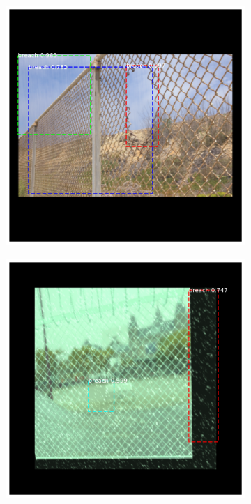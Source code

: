 \documentclass[../Head/Main.tex]{subfiles}
\begin{document}
\begin{figure}[H]
\begin{subfigure}{.23\textwidth}
        \caption{}
    \end{subfigure}
    \hfill
    \begin{subfigure}{.23\textwidth}
        \centering
        \includegraphics[width=\textwidth]{../Figures/rcnn_results/found_breaches/bad_performance/7.png}
        \caption{}
    \end{subfigure}
    \hfill
    \begin{subfigure}{.23\textwidth}
        \centering
        \includegraphics[width=\textwidth]{../Figures/rcnn_results/found_breaches/bad_performance/13.png}

\end{subfigure}
\end{figure}
\end{document}
